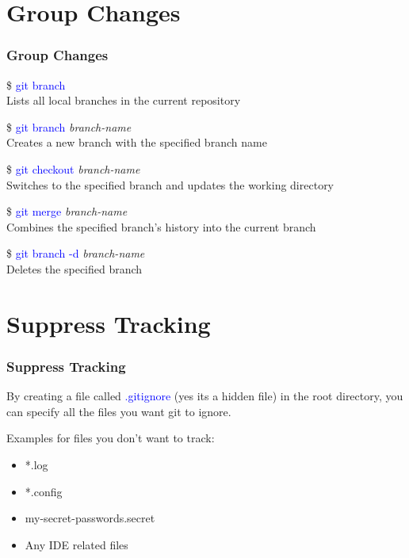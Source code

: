 \documentclass[aspectratio=169]{beamer}
\begin{document}
\section{Group Changes}
\begin{frame}

\frametitle{Group Changes}

\$ \textcolor{blue}{git branch}\\
Lists all local branches in the current repository

\pause

\$ \textcolor{blue}{git branch} \textit{branch-name}\\
Creates a new branch with the specified branch name

\pause

\$ \textcolor{blue}{git checkout} \textit{branch-name}\\
Switches to the specified branch and updates the working directory

\pause

\$ \textcolor{blue}{git merge} \textit{branch-name}\\
Combines the specified branch's history into the current branch

\pause

\$ \textcolor{blue}{git branch -d} \textit{branch-name}\\
Deletes the specified branch

\end{frame}

\section{Suppress Tracking}
\begin{frame}

\frametitle{Suppress Tracking}

By creating a file called \textcolor{blue}{.gitignore} (yes its a hidden file) in the root directory, you can specify all the files you want git to ignore.

\pause

Examples for files you don't want to track:

\begin{itemize}

\item *.log
\item *.config
\item my-secret-passwords.secret
\item Any IDE related files

\end{itemize}

\end{frame}
\end{document}
